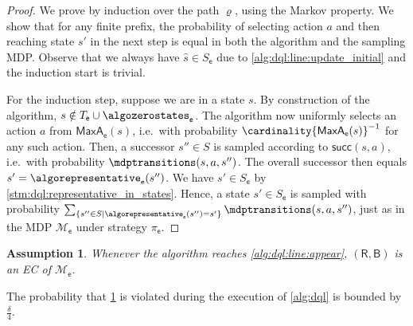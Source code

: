\documentclass{article}
\newcommand{\unionSym}{\cup}
\newcommand{\unionBin}{\mathbin{\unionSym}}
\newcommand{\union}{\unionBin}
\newcommand{\MDP}{\mathcal{M}}
\newcommand{\States}{S}
\newcommand{\initialstate}{\hat{s}}
\newcommand{\finitepath}{\varrho}
\newcommand{\strategy}{\pi}
\newcommand{\targetset}{T}
\newcommand{\successor}{\mathsf{succ}}
\newcommand{\algoepisode}{\mathsf{e}}
\newcommand{\umaxactions}{\mathsf{MaxA}}
\newtheorem{assumption}{Assumption}
\begin{document}
\begin{proof}
	We prove by induction over the path $\finitepath$, using the Markov property.
	We show that for any finite prefix, the probability of selecting action $a$ and then reaching state $s'$ in the next step is equal in both the algorithm and the sampling MDP.
	Observe that we always have $\initialstate \in \States_\algoepisode$ due to \cref{alg:dql:line:update_initial} and the induction start is trivial.

	For the induction step, suppose we are in a state $s$.
	By construction of the algorithm, $s \notin \targetset_\algoepisode \union \algozerostates_\algoepisode$.
	The algorithm now uniformly selects an action $a$ from $\umaxactions_\algoepisode(s)$, i.e.\ with probability $\cardinality{\umaxactions_\algoepisode(s)}^{-1}$ for any such action.
	Then, a successor $s'' \in \States$ is sampled according to $\successor(s, a)$, i.e.\ with probability $\mdptransitions(s, a, s'')$.
	The overall successor then equals $s' = \algorepresentative_\algoepisode(s'')$.
	We have $s' \in \States_\algoepisode$ by \cref{stm:dql:representative_in_states}.
	Hence, a state $s' \in \States_\algoepisode$ is sampled with probability $\sum_{\{s'' \in \States \mid \algorepresentative_\algoepisode(s'') = s'\}} \mdptransitions(s, a, s'')$, just as in the MDP $\MDP_\algoepisode$ under strategy $\strategy_\algoepisode$. 
\end{proof}

\begin{assumption} \label{asm:dql:always_collapse_ec}
	Whenever the algorithm reaches \cref{alg:dql:line:appear}, $(\mathsf{R}, \mathsf{B})$ is an EC of $\MDP_\algoepisode$.
\end{assumption}

\begin{lemma} \label{stm:dql:always_collapse_ec_probability}
	The probability that \cref{asm:dql:always_collapse_ec} is violated during the execution of \cref{alg:dql} is bounded by $\frac{\delta}{4}$.
\end{lemma}
\end{document}
